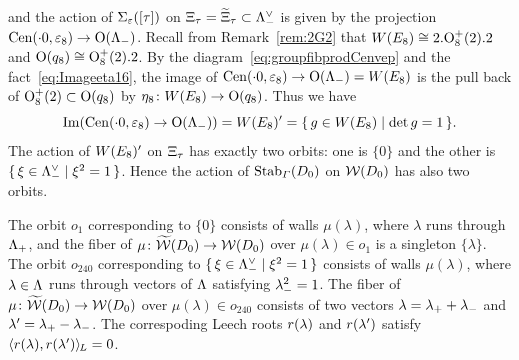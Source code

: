 \documentclass{amsart} %
\begin{document}
and the action of $\Sigma_{\varepsilon}([\tau])$ on $\Xi_{\tau}=\widetilde{\Xi}_{\tau}\subset \Lambda_{-}^{\vee}$
is given by the projection 
$\mathrm{Cen}(\cdot 0, \varepsilon_{8})\to \mathord{\mathrm{O}}(\Lambda_{-})$.
Recall from Remark~\ref{rem:2G2} that $W(E_8)\cong 2.\mathord{\mathrm{O}}^{+}_8(2).2$ and $ \mathord{\mathrm{O}}(q_8)\cong \mathord{\mathrm{O}}^{+}_8(2).2$.
By the diagram~\eqref{eq:groupfibprodCenvep} and 
the fact~\eqref{eq:Imageeta16}, 
the image of $\mathrm{Cen}(\cdot 0, \varepsilon_{8})\to \mathord{\mathrm{O}}(\Lambda_{-})=W(E_8)$ is 
the pull back of $\mathord{\mathrm{O}}^{+}_8(2)\subset \mathord{\mathrm{O}}(q_8)$ by 
$\eta_8\colon W(E_8)\to \mathord{\mathrm{O}}(q_8)$.
Thus we have 
\[
\operatorname{Im}(\mathrm{Cen}(\cdot 0, \varepsilon_{8})\to \mathord{\mathrm{O}}(\Lambda_{-}) )=W(E_8)^{\prime}=\{\,{g\in W(E_8)}\mid {\det g=1} \,\}.
\]
The action of $W(E_8)^{\prime}$ on $\Xi_{\tau}$ has exactly two orbits:
one is 
$\{0\}$ and the other is $\{\,{\xi\in \Lambda_{-}^{\vee}}\mid {\xi^2=1} \,\}$.
Hence the action of $\operatorname{Stab}_{\varGamma}(D_0)$ on $\mathord{\mathcal{W}}(D_0)$ 
has also two orbits.
\par
The orbit $o_1$ corresponding to $\{0\}$
consists of walls $\mu(\lambda)$,
where $\lambda$ runs through $\Lambda_{+}$,
and the fiber of $\mu\colon \widetilde{\mathord{\mathcal{W}}}(D_0)\to\mathord{\mathcal{W}}(D_0)$ 
over $\mu(\lambda)\in o_1$ is a singleton $\{\lambda\}$.
The orbit $o_{240}$ corresponding to $\{\,{\xi\in \Lambda_{-}^{\vee}}\mid {\xi^2=1} \,\}$
consists of walls $\mu(\lambda)$,
where $\lambda\in \Lambda$ runs through
vectors of $\Lambda$ satisfying ${\lambda}_{-}^2=1$.
The fiber of $\mu\colon \widetilde{\mathord{\mathcal{W}}}(D_0)\to\mathord{\mathcal{W}}(D_0)$ 
over $\mu(\lambda)\in o_{240}$ consists 
of two vectors
$\lambda={\lambda}_{+}+{\lambda}_{-}$ and $\lambda^{\prime}={\lambda}_{+}-{\lambda}_{-}$.
The correspoding Leech roots 
$r(\lambda)$ and $r(\lambda^{\prime})$ satisfy
$\langle r(\lambda), r(\lambda^{\prime}) \rangle_{\hskip -1pt L}=0$.
%
%
\end{document}
